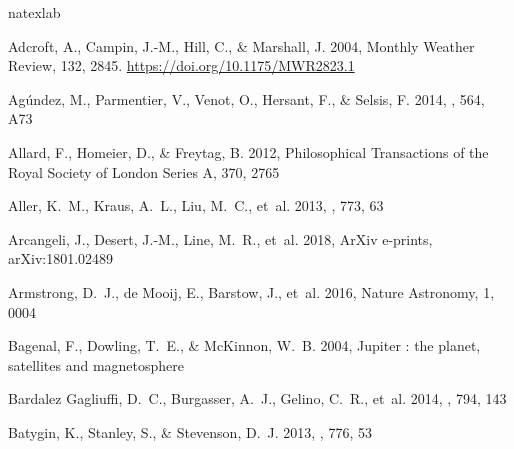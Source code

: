 \documentclass[twocolumn, trackchanges]{aastex61}
\begin{document}
 \newcommand{\noop}[1]{}
\begin{thebibliography}{}
\expandafter\ifx\csname natexlab\endcsname\relax\def\natexlab#1{#1}\fi
\providecommand{\url}[1]{\href{#1}{#1}}

Adcroft, A., Campin, J.-M., Hill, C., \& Marshall, J. 2004, Monthly Weather
  Review, 132, 2845.
\newblock \url{https://doi.org/10.1175/MWR2823.1}

{Ag{\'u}ndez}, M., {Parmentier}, V., {Venot}, O., {Hersant}, F., \& {Selsis},
  F. 2014, \aap, 564, A73

{Allard}, F., {Homeier}, D., \& {Freytag}, B. 2012, Philosophical Transactions
  of the Royal Society of London Series A, 370, 2765

{Aller}, K.~M., {Kraus}, A.~L., {Liu}, M.~C., {et~al.} 2013, \apj, 773, 63

{Arcangeli}, J., {Desert}, J.-M., {Line}, M.~R., {et~al.} 2018, ArXiv e-prints,
  arXiv:1801.02489

{Armstrong}, D.~J., {de Mooij}, E., {Barstow}, J., {et~al.} 2016, Nature
  Astronomy, 1, 0004

{Bagenal}, F., {Dowling}, T.~E., \& {McKinnon}, W.~B. 2004, {Jupiter : the
  planet, satellites and magnetosphere}

{Bardalez Gagliuffi}, D.~C., {Burgasser}, A.~J., {Gelino}, C.~R., {et~al.}
  2014, \apj, 794, 143

{Batygin}, K., {Stanley}, S., \& {Stevenson}, D.~J. 2013, \apj, 776, 53


\end{thebibliography}
\end{document}
